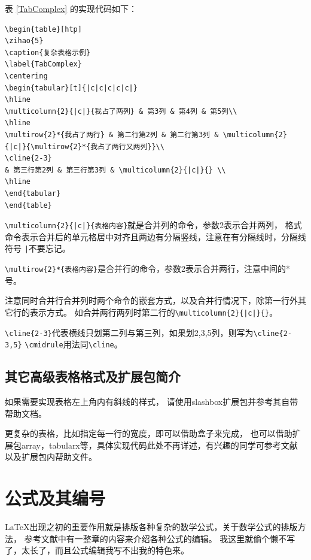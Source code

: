 表 \ref{TabComplex} 的实现代码如下：

{
\linespread{1}
\noindent
\begin{verbatim}
\begin{table}[htp]
\zihao{5}
\caption{复杂表格示例}
\label{TabComplex}
\centering
\begin{tabular}[t]{|c|c|c|c|c|}
\hline
\multicolumn{2}{|c|}{我占了两列} & 第3列 & 第4列 & 第5列\\
\hline
\multirow{2}*{我占了两行} & 第二行第2列 & 第二行第3列 & \multicolumn{2}{|c|}{\multirow{2}*{我占了两行又两列}}\\
\cline{2-3}
& 第三行第2列 & 第三行第3列 & \multicolumn{2}{|c|}{} \\
\hline
\end{tabular}
\end{table}
\end{verbatim}
}

\verb+\multicolumn{2}{|c|}{表格内容}+就是合并列的命令，参数2表示合并两列，
格式命令表示合并后的单元格居中对齐且两边有分隔竖线，注意在有分隔线时，分隔线符号
\verb+|+不要忘记。

\verb+\multirow{2}*{表格内容}+是合并行的命令，参数2表示合并两行，注意中间的*号。

注意同时合并行合并列时两个命令的嵌套方式，以及合并行情况下，除第一行外其它行的表示方式。
如合并两行两列时第二行的\verb+\multicolumn{2}{|c|}{}+。

\verb+\cline{2-3}+代表横线只划第二列与第三列，如果划2,3,5列，则写为\verb+\cline{2-3,5}+
\verb+\cmidrule+用法同\verb+\cline+。

\subsection{其它高级表格格式及扩展包简介}

如果需要实现表格左上角内有斜线的样式，
请使用slashbox扩展包并参考其自带帮助文档。

更复杂的表格，比如指定每一行的宽度，即可以借助盒子\cite{LaTeXshzh}来完成，
也可以借助扩展包array，tabularx等，具体实现代码此处不再详述，有兴趣的同学可参考文献
\cite{LaTeXshzh, Table:Lapo}以及扩展包内帮助文件。

\section{公式及其编号}

\LaTeX 出现之初的重要作用就是排版各种复杂的数学公式，关于数学公式的排版方法，
参考文献\cite{LaTeXshzh}中有一整章的内容来介绍各种公式的编辑。
我这里就偷个懒不写了，太长了，而且公式编辑我写不出我的特色来。

